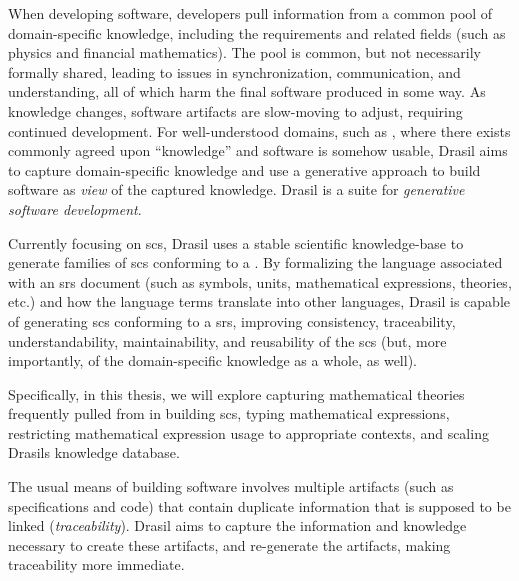 When developing software, developers pull information from a common pool of
domain-specific knowledge, including the requirements and related fields (such
as physics and financial mathematics). The pool is common, but not necessarily
formally shared, leading to issues in synchronization, communication, and
understanding, all of which harm the final software produced in some way. As
knowledge changes, software artifacts are slow-moving to adjust, requiring
continued development. For well-understood domains, such as , where
there exists commonly agreed upon ``knowledge'' and software is somehow usable,
Drasil aims to capture domain-specific knowledge and use a generative approach
to build software as \textit{view} of the captured knowledge. Drasil is a suite
for \textit{generative software development}.

Currently focusing on \acs{scs}, Drasil uses a stable scientific knowledge-base
to generate families of \acs{scs} conforming to a 
\cite{SmithAndLai2005}. By formalizing the language associated with an \acf{srs}
document (such as symbols, units, mathematical expressions, theories, etc.) and
how the language terms translate into other languages, Drasil is capable of
generating \acs{scs} conforming to a \acf{srs}, improving consistency,
traceability, understandability, maintainability, and reusability of the
\acf{scs} (but, more importantly, of the domain-specific knowledge as a whole,
as well).

Specifically, in this thesis, we will explore capturing mathematical theories
frequently pulled from in building \acs{scs}, typing mathematical expressions,
restricting mathematical expression usage to appropriate contexts, and scaling
Drasils knowledge database.


\iffalse
      The usual means of building software involves multiple artifacts (such as
      specifications and code) that contain duplicate information that is
      supposed to be linked (\textit{traceability}). Drasil aims to capture the
      information and knowledge necessary to create these artifacts, and
      re-generate the artifacts, making traceability more immediate.

